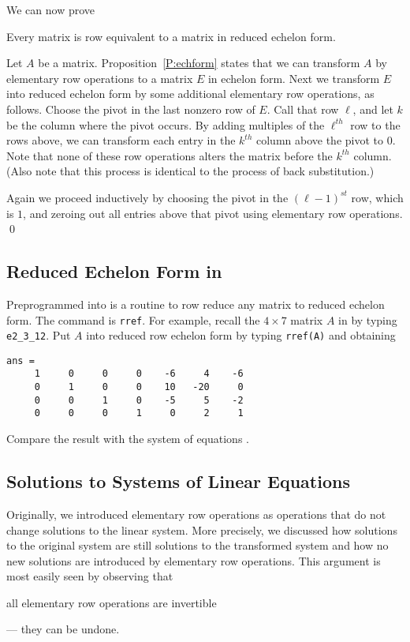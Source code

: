 We can now prove
\begin{thm}  \label{T:redechform}
Every matrix is row equivalent  to a matrix
in reduced echelon form.
\end{thm}

\proof Let $A$ be a matrix.  Proposition~\ref{P:echform} states
that we can transform $A$ by elementary row operations to a matrix
$E$ in echelon form.  Next we transform $E$ into reduced echelon
form by some additional elementary row operations, as follows.
Choose the pivot in the last nonzero row of $E$.  Call that row
$\ell$, and let $k$ be the column where the pivot occurs.  By
adding multiples of the $\ell^{th}$ row to the rows above, we can
transform each entry in the $k^{th}$ column above the pivot to $0$.
Note that none of these row operations alters the matrix before
the $k^{th}$ column.  (Also note that this process is identical to
the process of back substitution.)

Again we proceed inductively by choosing the pivot in the
$(\ell-1)^{st}$ row, which is $1$, and zeroing out all entries
above that pivot using elementary row operations.  \qed

\subsection*{Reduced Echelon Form in \Matlab}

Preprogrammed into \Matlab is a routine to row reduce any
matrix to reduced echelon form.  The command is
{\tt rref}.
For example, recall the $4\times 7$ matrix $A$ in 
by typing {\tt e2\_3\_12}.  Put $A$ into reduced row echelon
form by typing {\tt rref(A)} and obtaining
\begin{verbatim}
ans =
     1     0     0     0    -6     4    -6
     0     1     0     0    10   -20     0
     0     0     1     0    -5     5    -2
     0     0     0     1     0     2     1
\end{verbatim}
Compare the result with the system of equations .

\subsection*{Solutions to Systems of Linear Equations}

Originally, we introduced elementary row
operations as operations that do not change solutions to the
linear system.  More precisely, we discussed how solutions to
the original system are still solutions to the transformed
system and how no new solutions are introduced by elementary
row operations.  This argument is most easily seen by observing
that
\begin{center}
all elementary row operations are invertible
\end{center}
--- they can be undone.

